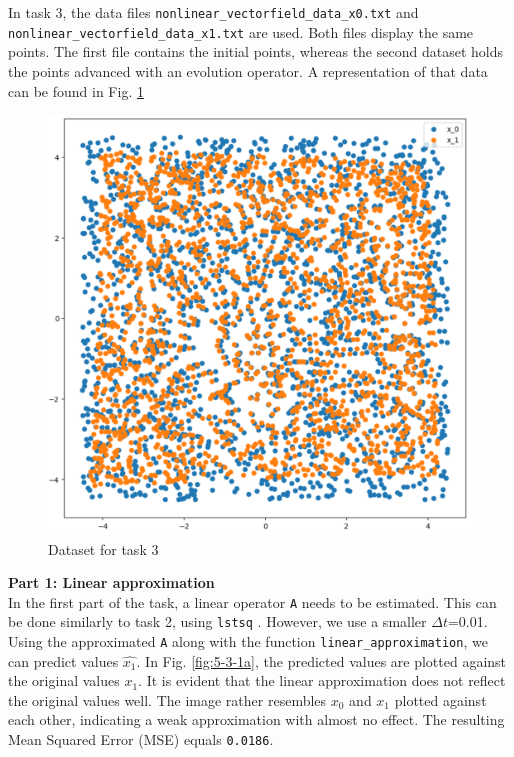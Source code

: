 In task 3, the data files \texttt{nonlinear\_vectorfield\_data\_x0.txt} and \texttt{nonlinear\_vectorfield\_data\_x1.txt} are used. Both files display the same points. The first file contains the initial points, whereas the second dataset holds the points advanced with an evolution operator. A representation of that data can be found in Fig. \ref{fig:5-3} \\

\begin{figure}[H]
    \centering
    \includegraphics[width=0.4\linewidth]{images/5_3_data.png}
    \caption{Dataset for task 3}
    \label{fig:5-3}
\end{figure}


\textbf{Part 1: Linear approximation} \\
In the first part of the task, a linear operator \texttt{A} needs to be estimated. This can be done similarly to task 2, using \texttt{lstsq} \cite{2020SciPy-NMeth}. However, we use a smaller $\Delta t$=0.01. Using the approximated \texttt{A} along with the function \texttt{linear\_approximation}, we can predict values $\hat{x_1}$. In Fig. \ref{fig:5-3-1a}, the predicted values are plotted against the original values $x_1$. It is evident that the linear approximation does not reflect the original values well. The image rather resembles $x_0$ and $x_1$ plotted against each other, indicating a weak approximation with almost no effect. The resulting Mean Squared Error (MSE) equals \texttt{0.0186}. \\


